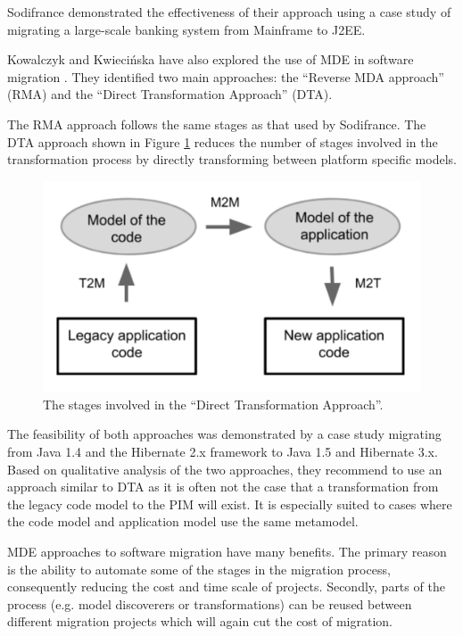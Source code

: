 \documentclass{UoYCSproject}
\begin{document}
Sodifrance demonstrated the effectiveness of their approach using a case study of migrating a large-scale banking system from Mainframe to J2EE.

Kowalczyk and Kwieci\'nska have also explored the use of MDE in software migration \parencite{kowalczyk2009model}. They identified two main approaches: the ``Reverse MDA approach'' (RMA) and the ``Direct Transformation Approach'' (DTA).

The RMA approach follows the same stages as that used by Sodifrance. The DTA approach shown in Figure \ref{fig:dta} reduces the number of stages involved in the transformation process by directly transforming between platform specific models. 

\begin{figure}[h!]
  \includegraphics[width=\linewidth]{graphics/dta.png}
  \caption{The stages involved in the ``Direct Transformation Approach''.}
  \label{fig:dta}
\end{figure}

The feasibility of both approaches was demonstrated by a case study migrating from Java 1.4 and the Hibernate 2.x framework to Java 1.5 and Hibernate 3.x. Based on qualitative analysis of the two approaches, they recommend to use an approach similar to DTA as it is often not the case that a transformation from the legacy code model to the PIM will exist. It is especially suited to cases where the code model and application model use the same metamodel. 

MDE approaches to software migration have many benefits. The primary reason is the ability to automate some of the stages in the migration process, consequently reducing the cost and time scale of projects. Secondly, parts of the process (e.g. model discoverers or transformations) can be reused between different migration projects which will again cut the cost of migration.
\end{document}
